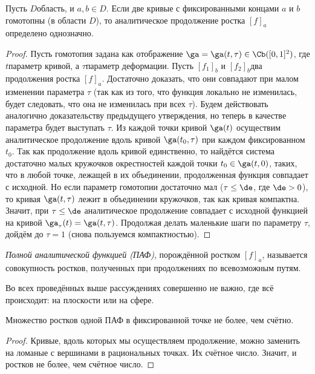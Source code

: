 \documentclass[a4paper]{article}
\begin{document}
\begin{theorem}[о монодромии]
Пусть $D$\т область, и $a,b\in D$. Если две кривые с фиксированными концами $a$ и $b$ гомотопны (в области $D$),
то аналитическое продолжение ростка $[f]_a$ определено однозначно.
\end{theorem}
\begin{proof}
Пусть гомотопия задана как отображение $\ga=\ga(t,\tau) \in \Cb([0,1]^2)$, где $t$\т параметр кривой, а $\tau$\т параметр
деформации. Пусть $[f_1]_b$ и $[f_2]_b$\т два продолжения ростка $[f]_a$. Достаточно доказать, что они совпадают при
малом изменении параметра $\tau$ (так как из того, что функция локально не изменилась, будет следовать, что она не изменилась
при всех $\tau$). Будем действовать аналогично доказательству предыдущего утверждения, но теперь в качестве
параметра будет выступать $\tau$. Из каждой точки кривой $\ga(t)$ осуществим аналитическое продолжение вдоль кривой $\ga(t_0,\tau)$
при каждом фиксированном $t_0$. Так как продолжение вдоль кривой единственно, то найдётся система достаточно малых кружочков\т
окрестностей каждой точки $t_0\in\ga(t,0)$, таких, что в любой точке, лежащей в их объединении, продолженная функция совпадает
с исходной. Но если параметр гомотопии достаточно мал ($\tau \le \de$, где $\de>0$), то кривая $\ga(t,\tau)$ лежит в объединении
кружочков, так как кривая компактна. Значит, при $\tau\le\de$ аналитическое продолжение совпадает с исходной функцией
на кривой $\ga_\tau(t)= \ga(t,\tau)$. Продолжая делать маленькие шаги по параметру $\tau$, дойдём до $\tau=1$
(снова пользуемся компактностью).
\end{proof}

\begin{df}
\emph{Полной аналитической функцией (ПАФ)}, порождённой ростком  $[f]_a$, называется
совокупность ростков, полученных при продолжениях по всевозможным путям.
\end{df}

\begin{note}
Во всех проведённых выше рассуждениях совершенно не важно, где всё происходит: на плоскости или на сфере.
\end{note}

\begin{theorem}[Вольтерра]
Множество ростков одной ПАФ в фиксированной точке не более, чем счётно.
\end{theorem}
\begin{proof}
Кривые, вдоль которых мы осуществляем продолжение, можно заменить на ломаные с вершинами в рациональных точках.
Их счётное число. Значит, и ростков не более, чем счётное число.
\end{proof}
\end{document}
